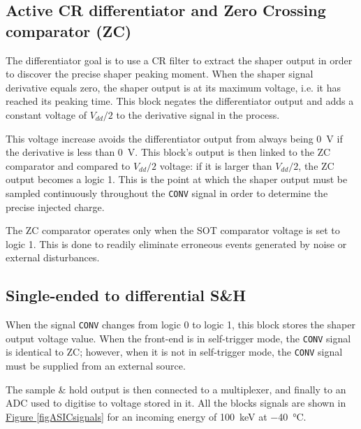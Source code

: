 
\subsection{Active CR differentiator and Zero Crossing comparator (ZC)}
\label{zeroCrossing}
The differentiator goal is to use a CR filter to extract the shaper output in order to discover the precise shaper peaking moment. When the shaper signal derivative equals zero, the shaper output is at its maximum voltage, i.e. it has reached its peaking time. This block negates the differentiator output and adds a constant voltage of $V_{dd}/2$ to the derivative signal in the process.

This voltage increase avoids the differentiator output from always being \SI{0}{V} if the derivative is less than \SI{0}{V}. This block's output is then linked to the ZC comparator and compared to $V_{dd}/2$ voltage: if it is larger than $V_{dd}/2$, the ZC output becomes a logic 1. This is the point at which the shaper output must be sampled continuously throughout the \texttt{CONV} signal in order to determine the precise injected charge.

\par
The ZC comparator operates only when the SOT comparator voltage is set to logic 1. This is done to readily eliminate erroneous events generated by noise or external disturbances.


\subsection{Single-ended to differential S\&H}
When the signal \texttt{CONV} changes from logic 0 to logic 1, this block stores the shaper output voltage value. When the front-end is in self-trigger mode, the \texttt{CONV} signal is identical to ZC; however, when it is not in self-trigger mode, the \texttt{CONV} signal must be supplied from an external source.

\par
The sample \& hold output is then connected to a multiplexer, and finally to an ADC used to digitise to voltage stored in it. All the blocks signals are shown in \hyperref[figASICsignals]{Figure \ref{figASICsignals}} for an incoming energy of \SI{100}{\kilo\electronvolt} at \SI{-40}{\celsius}.

